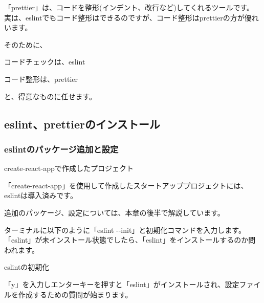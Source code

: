 「prettier」は、コードを整形(インデント、改行など)してくれるツールです。
実は、eslintでもコード整形はできるのですが、コード整形はprettierの方が優れいます。

\vspace*{\baselineskip}

そのために、

\begin{starteritemize}
\item コードチェックは、eslint
\item コード整形は、prettier
\end{starteritemize}

と、得意なものに任せます。

\subsection{eslint、prettierのインストール}
\keeplastskip{
  \label{sec:2-3-1}
  \label{sec-03eslint}
  \par\nobreak
}

\subsubsection*{eslintのパッケージ追加と設定}
\keeplastskip{
  \label{sec:2-3-1-1}
  \label{sec-03eslint-install}
  \par\nobreak
}
\begin{starternote}[]{create{-}react{-}appで作成したプロジェクト}

「create{-}react{-}app」を使用して作成したスタートアッププロジェクトには、eslintは導入済みです。

\vspace*{\baselineskip}

追加のパッケージ、設定については、本章の後半で解説しています。

\end{starternote}

ターミナルに以下のように「eslint {-}{-}init」と初期化コマンドを入力します。
「eslint」が未インストール状態でしたら、「eslint」をインストールするのか問われます。

\def\startercodeblockfontsize{}
\begin{starterterminal}[]{eslintの初期化}\end{starterterminal}

「y」を入力しエンターキーを押すと「eslint」がインストールされ、設定ファイルを作成するための質問が始まります。


